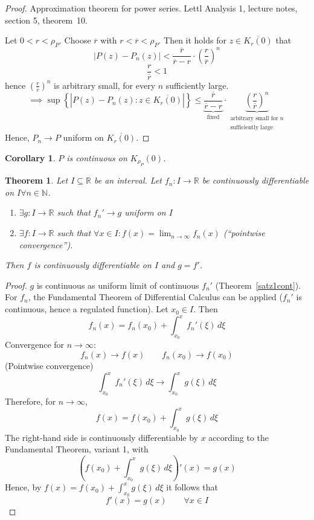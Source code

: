 \documentclass{article}
\newtheorem{theorem}{Theorem}  \numberwithin{theorem}{section}
\newtheorem*{corollary}{Corollary}%
\newcommand{\set}[1]{\left\{#1\right\}}
\newcommand{\card}[1]{\left|#1\right|}
\begin{document}
\begin{proof}
  Approximation theorem for power series.
  Lettl Analysis 1, lecture notes, section 5, theorem~10.

  Let $0 < r < \rho_P$. Choose $\overline{r}$ with $r < \overline{r} < \rho_P$.
  Then it holds for $z \in \overline{K_r(0)}$ that
  \[ \card{P(z) - P_n(z)} < \frac{\overline{r}}{\overline{r} - r} \cdot \left(\frac{r}{\overline{r}}\right)^n \]
  \[ \frac{r}{\overline{r}} < 1 \]
  hence $\left(\frac{r}{\overline{r}}\right)^n$ is arbitrary small, for every $n$ sufficiently large.
  \[ \implies \sup\set{\card{P(z) - P_n(z): z \in \overline{K_r(0)}}} \leq \underbrace{\frac{\overline r}{\overline r - r}}_{\text{fixed}} \cdot \underbrace{\left(\frac{r}{\overline{r}}\right)^n}_{\substack{\text{arbitrary small for $n$} \\ \text{sufficiently large}}} \]
  Hence, $P_n \to P$ uniform on $\overline{K_r(0)}$.
\end{proof}

\begin{corollary}
  $P$ is continuous on $K_{\rho_P}(0)$.
\end{corollary}

\begin{theorem}
  Let $I \subseteq \mathbb R$ be an interval.
  Let $f_n: I \to \mathbb R$ be continuously differentiable on $I \forall n \in \mathbb N$.
  \begin{enumerate}
    \item $\exists g: I \to \mathbb R$ such that $f_n' \to g$ uniform on $I$
    \item $\exists f: I \to \mathbb R$ such that $\forall x \in I: f(x) = \lim_{n\to\infty} f_n(x)$ (\enquote{pointwise convergence}).
  \end{enumerate}
  Then $f$ is continuously differentiable on $I$ and $g = f'$.
\end{theorem}

\begin{proof}
  $g$ is continuous as uniform limit of continuous $f_n'$ (Theorem~\ref{satz1cont}).
  For $f_n$, the Fundamental Theorem of Differential Calculus can be applied ($f_n'$ is continuous, hence a regulated function).
  Let $x_0 \in I$. Then
  \[ f_n(x) = f_n(x_0) + \int_{x_0}^x f_n'(\xi) \, d\xi \]
  Convergence for $n \to \infty$:
  \[ f_n(x) \to f(x) \qquad f_n(x_0) \to f(x_0) \]
  (Pointwise convergence)
  \[ \int_{x_0}^x f_n'(\xi) \, d\xi \to \int_{x_0}^x g(\xi) \, d\xi \]
  Therefore, for $n \to \infty$,
  \[ f(x) = f(x_0) + \int^x_{x_0} g(\xi) \, d\xi \]
  The right-hand side is continuously differentiable by $x$ according to the Fundamental Theorem, variant 1,
  with
  \[ \left(f(x_0) + \int_{x_0}^x g(\xi) \, d\xi\right)'(x) = g(x) \]
  Hence, by $f(x) = f(x_0) + \int^x_{x_0} g(\xi) \, d\xi$ it follows that
  \[ f'(x) = g(x) \qquad \forall x \in I \]
\end{proof}
\end{document}
